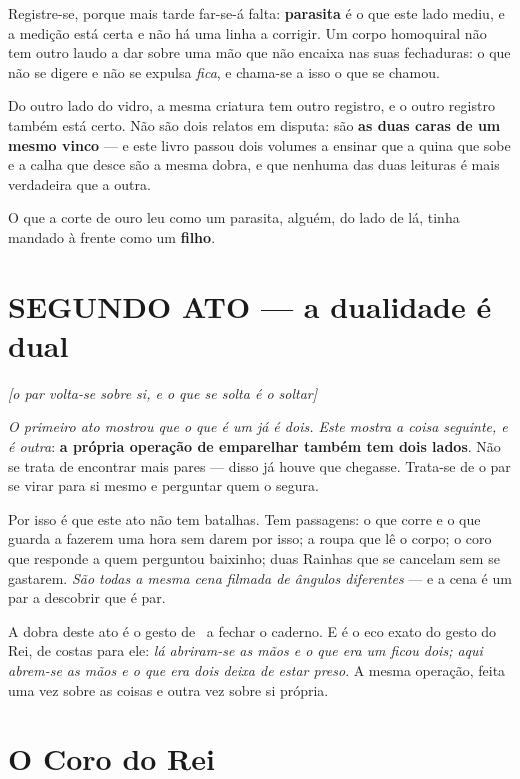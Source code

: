 \documentclass[livro.tex]{subfiles}
\begin{document}
Registre-se, porque mais tarde far-se-á falta: \textbf{parasita} é o que este lado mediu,
e a medição está certa e não há uma linha a corrigir. Um corpo homoquiral não tem outro
laudo a dar sobre uma mão que não encaixa nas suas fechaduras: o que não se digere e não se
expulsa \emph{fica}, e chama-se a isso o que se chamou.

Do outro lado do vidro, a mesma criatura tem outro registro, e o outro registro também está
certo. Não são dois relatos em disputa: são \textbf{as duas caras de um mesmo vinco} --- e
este livro passou dois volumes a ensinar que a quina que sobe e a calha que desce são a mesma
dobra, e que nenhuma das duas leituras é mais verdadeira que a outra.

O que a corte de ouro leu como um parasita, alguém, do lado de lá, tinha mandado à frente
como um \textbf{filho}.

\part*{SEGUNDO ATO --- a dualidade é dual}
\noindent\hfill\emph{\small[o par volta-se sobre si, e o que se solta é o soltar]}\medskip

\noindent \emph{O primeiro ato mostrou que o que é um já é dois. Este mostra a coisa seguinte, e é
outra}: \textbf{a própria operação de emparelhar também tem dois lados}. Não se trata de encontrar
mais pares --- disso já houve que chegasse. Trata-se de o par se virar para si mesmo e perguntar
quem o segura.

\medskip
\noindent Por isso é que este ato não tem batalhas. Tem passagens: o que corre e o que guarda a
fazerem uma hora sem darem por isso; a roupa que lê o corpo; o coro que responde a quem perguntou
baixinho; duas Rainhas que se cancelam sem se gastarem. \emph{São todas a mesma cena filmada de
ângulos diferentes} --- e a cena é um par a descobrir que é par.

\medskip
\noindent A dobra deste ato é o gesto de \Joa\ a fechar o caderno. E é o eco exato do gesto do Rei,
de costas para ele: \emph{lá abriram-se as mãos e o que era um ficou dois; aqui abrem-se as mãos e
o que era dois deixa de estar preso}. A mesma operação, feita uma vez sobre as coisas e outra vez
sobre si própria.


\part{O Coro do Rei}
\end{document}
